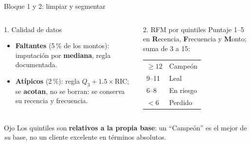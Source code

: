 \documentclass[aspectratio=169,xcolor=dvipsnames]{beamer}
\begin{document}
\begin{frame}{Bloque 1 y 2: limpiar y segmentar}
\begin{columns}[T]
  \begin{block}{1. Calidad de datos}
    \scriptsize
    \begin{itemize}
      \item \textbf{Faltantes} (5\,\% de los montos): imputación por \textbf{mediana}, regla documentada.
      \item \textbf{Atípicos} (2\,\%): regla $Q_3+1.5\times\mathrm{RIC}$; se \textbf{acotan}, no se borran: se conserva su recencia y frecuencia.
    \end{itemize}
  \end{block}
  \begin{exampleblock}{2. RFM por quintiles}
    \scriptsize
    Puntaje 1--5 en \textbf{R}ecencia, \textbf{F}recuencia y \textbf{M}onto; suma de 3 a 15:\\[2pt]
    \begin{tabular}{@{}ll@{}}
      $\geq 12$ & Campeón \\
      9--11 & Leal \\
      6--8 & En riesgo \\
      $<6$ & Perdido \\
    \end{tabular}
  \end{exampleblock}
\end{columns}
\vspace{4pt}
\begin{alertblock}{Ojo}
  \small Los quintiles son \textbf{relativos a la propia base}: un \enquote{Campeón} es el mejor de \textit{su} base, no un cliente excelente en términos absolutos.
\end{alertblock}
\end{frame}
\end{document}

